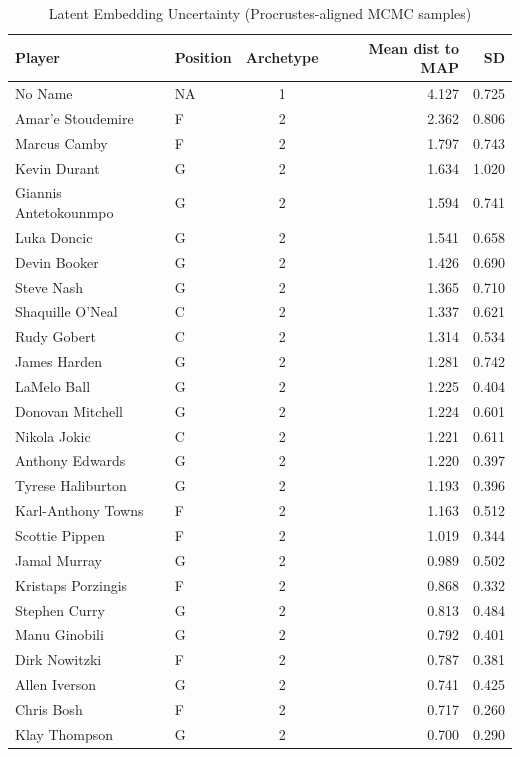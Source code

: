 \begin{table}[t]
\caption*{
{\fontsize{20}{25}\selectfont  Latent Embedding Uncertainty (Procrustes-aligned MCMC samples)\fontsize{12}{15}\selectfont }
} 
\fontsize{12.0pt}{14.0pt}\selectfont
\begin{tabular*}{\linewidth}{@{\extracolsep{\fill}}llcrr}
\toprule
Player & Position & Archetype & Mean dist to MAP & SD \\ 
\midrule\addlinespace[2.5pt]
No Name & NA & 1 & 4.127 & 0.725 \\ 
Amar'e Stoudemire & F & 2 & 2.362 & 0.806 \\ 
Marcus Camby & F & 2 & 1.797 & 0.743 \\ 
Kevin Durant & G & 2 & 1.634 & 1.020 \\ 
Giannis Antetokounmpo & G & 2 & 1.594 & 0.741 \\ 
Luka Doncic & G & 2 & 1.541 & 0.658 \\ 
Devin Booker & G & 2 & 1.426 & 0.690 \\ 
Steve Nash & G & 2 & 1.365 & 0.710 \\ 
Shaquille O'Neal & C & 2 & 1.337 & 0.621 \\ 
Rudy Gobert & C & 2 & 1.314 & 0.534 \\ 
James Harden & G & 2 & 1.281 & 0.742 \\ 
LaMelo Ball & G & 2 & 1.225 & 0.404 \\ 
Donovan Mitchell & G & 2 & 1.224 & 0.601 \\ 
Nikola Jokic & C & 2 & 1.221 & 0.611 \\ 
Anthony Edwards & G & 2 & 1.220 & 0.397 \\ 
Tyrese Haliburton & G & 2 & 1.193 & 0.396 \\ 
Karl-Anthony Towns & F & 2 & 1.163 & 0.512 \\ 
Scottie Pippen & F & 2 & 1.019 & 0.344 \\ 
Jamal Murray & G & 2 & 0.989 & 0.502 \\ 
Kristaps Porzingis & F & 2 & 0.868 & 0.332 \\ 
Stephen Curry & G & 2 & 0.813 & 0.484 \\ 
Manu Ginobili & G & 2 & 0.792 & 0.401 \\ 
Dirk Nowitzki & F & 2 & 0.787 & 0.381 \\ 
Allen Iverson & G & 2 & 0.741 & 0.425 \\ 
Chris Bosh & F & 2 & 0.717 & 0.260 \\ 
Klay Thompson & G & 2 & 0.700 & 0.290 \\ 

\end{tabular*}
\end{table}
